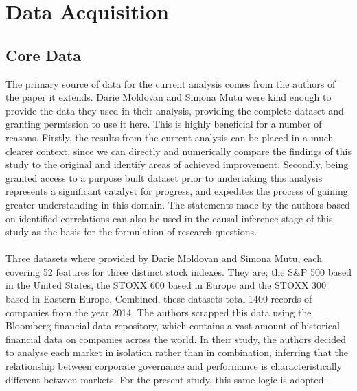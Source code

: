 \section{Data Acquisition}
\subsection{Core Data}
{The primary source of data for the current analysis comes from the authors of the paper it extends. Darie Moldovan and Simona Mutu were kind enough to provide the data they used in their analysis, providing the complete dataset and granting permission to use it here. This is highly beneficial for a number of reasons. Firstly, the results from the current analysis can be placed in a much clearer context, since we can directly and numerically compare the findings of this study to the original and identify areas of achieved improvement. Secondly, being granted access to a purpose built dataset prior to undertaking this analysis represents a significant catalyst for progress, and expedites the process of gaining greater understanding in this domain. The statements made by the authors based on identified correlations can also be used in the causal inference stage of this study as the basis for the formulation of research questions.}\\\\
{Three datasets where provided by Darie Moldovan and Simona Mutu, each covering 52 features for three distinct stock indexes. They are; the S\&P 500 based in the United States, the STOXX 600 based in Europe and the STOXX 300 based in Eastern Europe. Combined, these datasets total 1400 records of companies from the year 2014. The authors scrapped this data using the Bloomberg financial data repository, which contains a vast amount of historical financial data on companies across the world. In their study, the authors decided to analyse each market in isolation rather than in combination, inferring that the relationship between corporate governance and performance is characteristically different between markets. For the present study, this same logic is adopted.   }
